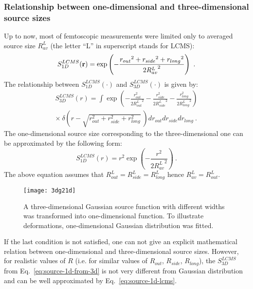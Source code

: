       \subsubsection{Relationship between one-dimensional and three-dimensional source sizes}
      Up to now, most of femtoscopic measurements were limited only to averaged source size $R^L_{av}$ (the letter ``L'' in superscript stands for LCMS):
      \begin{equation}
        S^{LCMS}_{1D} (\mathbf{r}) = \exp \left( - \frac{ {r_{out}}^{2} + {r_{side}}^{2} + {r_{long}}^{2}}{2 {R^{L}_{av}}^2} \right)~.
      \end{equation}
      The relationship between $S^{LCMS}_{1D}(\cdot)$ and $S^{LCMS}_{3D}(\cdot)$ is given by:
      \begin{equation}
        \begin{split}
        \label{eq:source-1d-from-3d}
        S^{LCMS}_{3D} (r) = \int \exp \left( 
          - \frac{ r_{out}^{2}}{2 {R^L_{out}}^2}
          - \frac{ r_{side}^{2}}{2 {R^L_{side}}^2}
          - \frac{ r_{long}^{2}}{2 {R^L_{long}}^2}
        \right)
        \\ \times~\delta \left(
          r - \sqrt{ r_{out}^{2} + r_{side}^{2} + r_{long}^{2}}
        ~\right)
        d r_{out} d r_{side} d r _{long}~.
        \end{split}
      \end{equation}
      The one-dimensional source size corresponding to the three-dimensional one can be approximated by the following form:
      \begin{equation}
        \label{eq:source-1d-lcms}
        S^{LCMS}_{1D} (r) = {r}^{2} \exp \left( - \frac{r^{2}}{2 {R^L_{av}}^2} \right)~.
      \end{equation}
      The above equation assumes that $R^L_{out} = R^L_{side} = R^L_{long}$ hence $R^L_{av} = R^L_{out}$.
      \begin{figure}[b]
        \centering
        \texttt{[image: 3dg21d]}
        \caption{A three-dimensional Gaussian source function with different widths was transformed into one-dimensional function. To illustrate deformations, one-dimensional Gaussian distribution was fitted.}
        \label{fig:3dgaussian}
      \end{figure}
      If the last condition is not satisfied, one can not give an explicit mathematical relation between one-dimensional and three-dimensional source sizes.
      However, for realistic values of $R$ (i.e. for similar values of $R_{out}$, $R_{side}$, $R_{long}$), the $S^{LCMS}_{3D}$ from Eq.~\ref{eq:source-1d-from-3d} is not very different from Gaussian distribution and can be well approximated by Eq.~\ref{eq:source-1d-lcms}.

